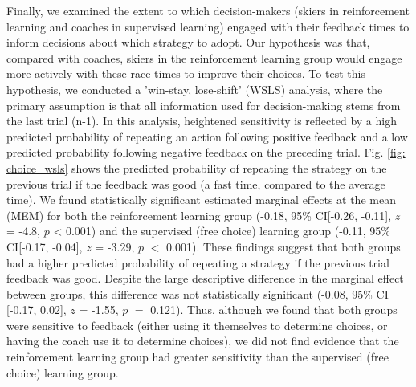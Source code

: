 \documentclass[pdflatex,sn-mathphys-num]{sn-jnl}%
\theoremstyle{thmstyleone}%
\theoremstyle{thmstyletwo}%
\theoremstyle{thmstylethree}%
\begin{document}
Finally, we examined the extent to which decision-makers (skiers in reinforcement learning and coaches in supervised learning) engaged with their feedback times to inform decisions about which strategy to adopt. Our hypothesis was that, compared with coaches, skiers in the reinforcement learning group would engage more actively with these race times to improve their choices. To test this hypothesis, we conducted a 'win-stay, lose-shift' (WSLS) analysis, where the primary assumption is that all information used for decision-making stems from the last trial (n-1). In this analysis, heightened sensitivity is reflected by a high predicted probability of repeating an action following positive feedback and a low predicted probability following negative feedback on the preceding trial. Fig. \ref{fig: choice_wsls} shows the predicted probability of repeating the strategy on the previous trial if the feedback was good (a fast time, compared to the average time). We found statistically significant estimated marginal effects at the mean (MEM) for both the reinforcement learning group (-0.18, 95\% CI[-0.26, -0.11], $z$ = -4.8, $p$ < 0.001) and the supervised (free choice) learning group (-0.11, 95\% CI[-0.17, -0.04], $z$ = -3.29, $p$ $<$ 0.001). These findings suggest that both groups had a higher predicted probability of repeating a strategy if the previous trial feedback was good. Despite the large descriptive difference in the marginal effect between groups, this difference was not statistically  significant (-0.08, 95\% CI [-0.17, 0.02], $z$ = -1.55, $p$ $=$ 0.121). Thus, although we found that both groups were sensitive to feedback (either using it themselves to determine choices, or having the coach use it to determine choices), we did not find evidence that the reinforcement learning group had greater sensitivity than the supervised (free choice) learning group. 
\end{document}
